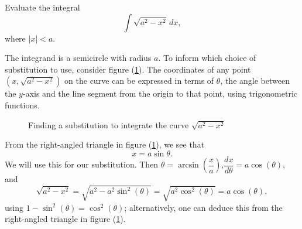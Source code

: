 \begin{example}

Evaluate the integral
  \[
	  \int \sqrt{a^2 - x^2} \, dx,
	\]
where \(\left|x\right| < a\).

The integrand is a semicircle with radius \(a\).  To inform which choice of substitution to use, consider figure (\ref{semicircleintegralindefinite}).  The coordinates of any point \((x, \sqrt{a^2 - x^2})\) on the curve can be expressed in terms of \(\theta\), the angle between the \(y\)-axis and the line segment from the origin to that point, using trigonometric functions.

  \begin{figure}[H]
    \centering
    \def\svgwidth{0.55\columnwidth}
    
    \caption{Finding a substitution to integrate the curve $\sqrt{a^2 - x^2}$}
    \label{semicircleintegralindefinite}
  \end{figure}
	

From the right-angled triangle in figure (\ref{semicircleintegralindefinite}), we see that
  \[
    x  =  a \sin{\theta}.
  \]
We will use this for our substitution.  Then $\theta=\arcsin \left(\dfrac{x}{a}\right)$,\quad $\dfrac{dx}{d \theta} = a \cos(\theta)$, and
  \[
	  \sqrt{a^2 - x^2} = \sqrt{a^2 - a^2\sin^2(\theta)} = \sqrt{a^2\cos^2(\theta)} = a\cos(\theta),
	\]
using \(1 - \sin^2(\theta) = \cos^2(\theta)\); alternatively, one can deduce this from the right-angled triangle in figure (\ref{semicircleintegralindefinite}).



\end{example}
